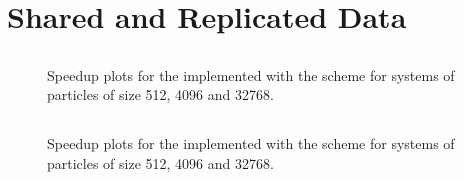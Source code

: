 \section{Shared and Replicated Data}

\subsection{\individualoperation{}}

%
%
\begin{figure}[!h]
    
    \caption{
        Speedup plots for the \individualoperation{} implemented with the \sharedandreplicateddata{} scheme for systems of particles of size 512, 4096 and 32768.
    }
    \label{fig:v1_shared_and_replicated_data_individual_operation_speedups}
\end{figure}


%
%
\begin{figure}[!h]
    
    \caption{}
    \label{fig:v1_shared_and_replicated_individual_operation_512_time}
\end  {figure}

\begin{figure}[!h]
    
    \caption{}
    \label{fig:v1_shared_and_replicated_individual_operation_4096_time}
\end  {figure}

\begin{figure}[!h]
    
    \caption{}
    \label{fig:v1_shared_and_replicated_individual_operation_32768_time}
\end  {figure}



\subsection{\pairoperation{}}

%
%
\begin{figure}[!h]
    
    \caption{
        Speedup plots for the \pairoperation{} implemented with the \sharedandreplicateddata{} scheme for systems of particles of size 512, 4096 and 32768.
    }
    \label{fig:v1_shared_and_replicated_data_pair_operation_speedups}
\end{figure}


